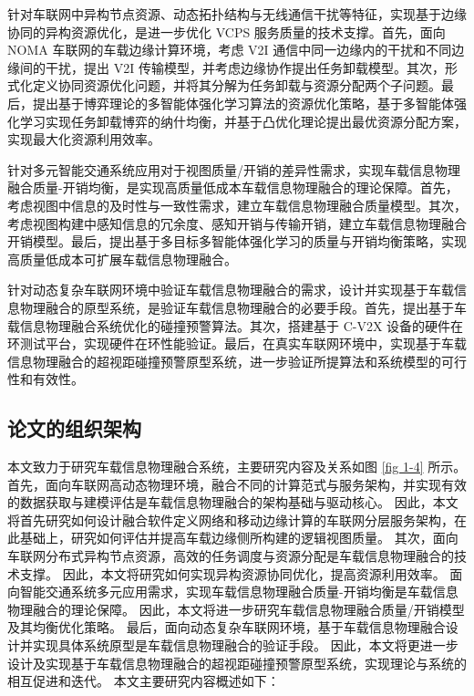  针对车联网中异构节点资源、动态拓扑结构与无线通信干扰等特征，实现基于边缘协同的异构资源优化，是进一步优化 VCPS 服务质量的技术支撑。首先，面向 NOMA 车联网的车载边缘计算环境，考虑 V2I 通信中同一边缘内的干扰和不同边缘间的干扰，提出 V2I 传输模型，并考虑边缘协作提出任务卸载模型。其次，形式化定义协同资源优化问题，并将其分解为任务卸载与资源分配两个子问题。最后，提出基于博弈理论的多智能体强化学习算法的资源优化策略，基于多智能体强化学习实现任务卸载博弈的纳什均衡，并基于凸优化理论提出最优资源分配方案，实现最大化资源利用效率。

 针对多元智能交通系统应用对于视图质量/开销的差异性需求，实现车载信息物理融合质量-开销均衡，是实现高质量低成本车载信息物理融合的理论保障。首先，考虑视图中信息的及时性与一致性需求，建立车载信息物理融合质量模型。其次，考虑视图构建中感知信息的冗余度、感知开销与传输开销，建立车载信息物理融合开销模型。最后，提出基于多目标多智能体强化学习的质量与开销均衡策略，实现高质量低成本可扩展车载信息物理融合。

 针对动态复杂车联网环境中验证车载信息物理融合的需求，设计并实现基于车载信息物理融合的原型系统，是验证车载信息物理融合的必要手段。首先，提出基于车载信息物理融合系统优化的碰撞预警算法。其次，搭建基于 C-V2X 设备的硬件在环测试平台，实现硬件在环性能验证。最后，在真实车联网环境中，实现基于车载信息物理融合的超视距碰撞预警原型系统，进一步验证所提算法和系统模型的可行性和有效性。

\subsection[\hspace{-2pt}论文的组织架构]{{ \hspace{-8pt}论文的组织架构}}

本文致力于研究车载信息物理融合系统，主要研究内容及关系如图 \ref{fig 1-4} 所示。
首先，面向车联网高动态物理环境，融合不同的计算范式与服务架构，并实现有效的数据获取与建模评估是车载信息物理融合的架构基础与驱动核心。
因此，本文将首先研究如何设计融合软件定义网络和移动边缘计算的车联网分层服务架构，在此基础上，研究如何评估并提高车载边缘侧所构建的逻辑视图质量。
其次，面向车联网分布式异构节点资源，高效的任务调度与资源分配是车载信息物理融合的技术支撑。
因此，本文将研究如何实现异构资源协同优化，提高资源利用效率。
面向智能交通系统多元应用需求，实现车载信息物理融合质量-开销均衡是车载信息物理融合的理论保障。
因此，本文将进一步研究车载信息物理融合质量/开销模型及其均衡优化策略。
最后，面向动态复杂车联网环境，基于车载信息物理融合设计并实现具体系统原型是车载信息物理融合的验证手段。
因此，本文将更进一步设计及实现基于车载信息物理融合的超视距碰撞预警原型系统，实现理论与系统的相互促进和迭代。
本文主要研究内容概述如下：

